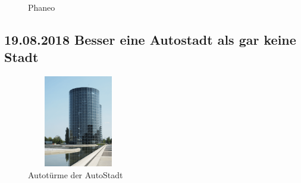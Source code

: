 \begin{figure}[H]
   \centering
   \quad
   \quad
   \quad
   \caption[Phaneo]{Phaneo}
\end{figure}

\subsection{19.08.2018 Besser eine Autostadt als gar keine Stadt}

\begin{figure} 
  \begin{centering}
    \includegraphics[width=0.4\textwidth, height=4cm, keepaspectratio]{../Bilder/Sylt/59.png}
    \caption{Autotürme der AutoStadt}
  \end{centering}
\end{figure} 

